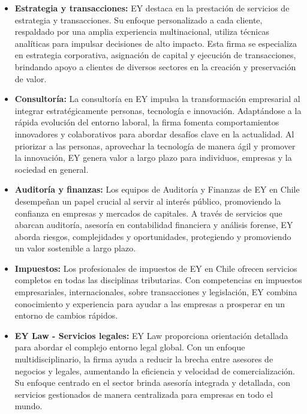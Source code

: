 \documentclass{article}[14pts]
\begin{document}
    \begin{itemize}

        \item \textbf{Estrategia y transacciones:} EY destaca en la prestación de servicios de estrategia y 
        transacciones. Su enfoque personalizado a cada cliente, respaldado por una amplia experiencia multinacional, utiliza técnicas analíticas para impulsar decisiones de alto impacto. Esta firma se especializa en estrategia corporativa, asignación de capital y ejecución de transacciones, brindando apoyo a clientes de diversos sectores en la creación y preservación de valor. 

        \item \textbf{Consultoría:} La consultoría en EY impulsa la transformación empresarial al integrar 
        estratégicamente personas, tecnología e innovación. Adaptándose a la rápida evolución del entorno laboral, la firma fomenta comportamientos innovadores y colaborativos para abordar desafíos clave en la actualidad. Al priorizar a las personas, aprovechar la tecnología de manera ágil y promover la innovación, EY genera valor a largo plazo para individuos, empresas y la sociedad en general.

        \item \textbf{Auditoría y finanzas:} Los equipos de Auditoría y Finanzas de EY en Chile desempeñan un papel 
        crucial al servir al interés público, promoviendo la confianza en empresas y mercados de capitales. A través de servicios que abarcan auditoría, asesoría en contabilidad financiera y análisis forense, EY aborda riesgos, complejidades y oportunidades, protegiendo y promoviendo un valor sostenible a largo plazo.

        \item \textbf{Impuestos:} Los profesionales de impuestos de EY en Chile ofrecen servicios completos en todas las disciplinas tributarias. Con competencias en impuestos empresariales, internacionales, sobre transacciones y legislación, EY combina conocimiento y experiencia para ayudar a las empresas a prosperar en un entorno de cambios rápidos.

        \item \textbf{EY Law - Servicios legales:} EY Law proporciona orientación detallada para abordar el complejo entorno legal global. Con un enfoque multidisciplinario, la firma ayuda a reducir la brecha entre asesores de negocios y legales, aumentando la eficiencia y velocidad de comercialización. Su enfoque centrado en el sector brinda asesoría integrada y detallada, con servicios gestionados de manera centralizada para empresas en todo el mundo.
        
        \end{itemize}
\end{document}
